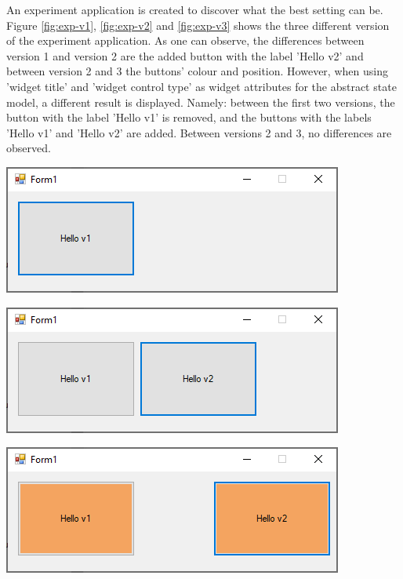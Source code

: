 An experiment application is created to discover what the best setting can be. Figure \ref{fig:exp-v1}, \ref{fig:exp-v2} and \ref{fig:exp-v3} shows the three different version of the experiment application. As one can observe, the differences between version 1 and version 2 are the added button with the label 'Hello v2' and between version 2 and 3 the buttons' colour and position. However, when using 'widget title' and 'widget control type' as widget attributes for the abstract state model, a different result is displayed. Namely: between the first two versions, the button with the label 'Hello v1' is removed, and the buttons with the labels 'Hello v1' and 'Hello v2' are added. Between versions 2 and 3, no differences are observed.

\begingroup
\captionsetup{type=figure}
\includegraphics[scale=1]{pics/exp-v1.png}
\label{fig:exp-v1}
\endgroup

\begingroup
\captionsetup{type=figure}
\includegraphics[scale=1]{pics/exp-v2.png}
\label{fig:exp-v2}
\endgroup

\begingroup
\captionsetup{type=figure}
\includegraphics[scale=1]{pics/exp-v3.png}
\label{fig:exp-v3}
\endgroup

